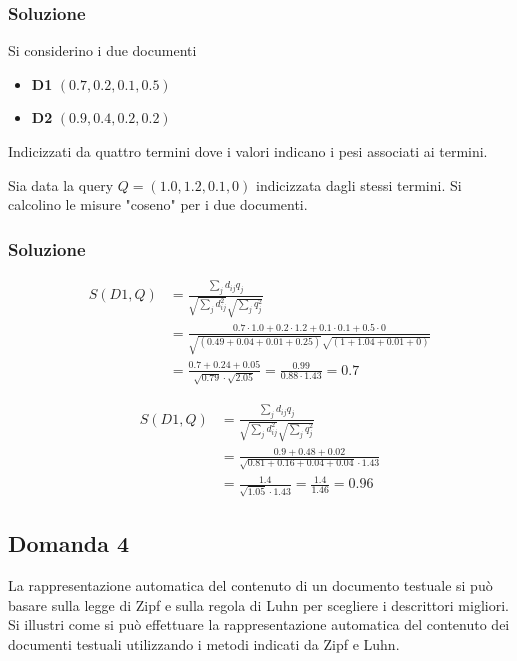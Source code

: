 \subsubsection{Soluzione}

Si considerino i due documenti

\begin{itemize}
	\item \textbf{D1} $(0.7, 0.2, 0.1, 0.5)$
	\item \textbf{D2} $(0.9, 0.4, 0.2, 0.2)$
\end{itemize}

Indicizzati da quattro termini dove i valori indicano i pesi associati ai termini.

Sia data la query $Q = (1.0, 1.2, 0.1, 0)$ indicizzata dagli stessi termini. Si calcolino le misure "coseno" per i due documenti.

\subsubsection{Soluzione}

\begin{align*}
S(D1, Q) &= \frac{
	\sum_j d_{ij}q_j
}{
	\sqrt{\sum_j d_{ij}^2}\sqrt{\sum_j q_{j}^2}
} \\
&= \frac{
	0.7\cdot 1.0 + 0.2 \cdot 1.2 + 0.1 \cdot 0.1 + 0.5 \cdot 0
}{
	\sqrt{(0.49 + 0.04 + 0.01 + 0.25)} \sqrt{(1 + 1.04 + 0.01 + 0)}
}\\
&= \frac{0.7 + 0.24 + 0.05}{\sqrt{0.79} \cdot \sqrt{2.05}} = \frac{0.99}{0.88 \cdot 1.43} = 0.7
\end{align*}

\begin{align*}
S(D1, Q) &= \frac{
	\sum_j d_{ij}q_j
}{
	\sqrt{\sum_j d_{ij}^2}\sqrt{\sum_j q_{j}^2}
} \\
&= \frac{
	0.9 + 0.48+ 0.02
}{
	\sqrt{0.81 + 0.16 + 0.04 + 0.04}\cdot 1.43
}\\
&= \frac{
	1.4
}{
	\sqrt{1.05}\cdot 1.43
} = \frac{1.4}{1.46} = 0.96
\end{align*}

\subsection{Domanda 4}

La rappresentazione automatica del contenuto di un documento testuale si può basare sulla legge di Zipf e sulla regola di Luhn per scegliere i descrittori migliori. Si illustri come si può effettuare la rappresentazione automatica del contenuto dei documenti testuali utilizzando i metodi indicati da Zipf e Luhn.

